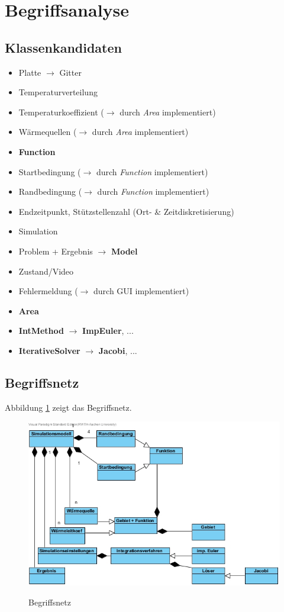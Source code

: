 \section{Begriffsanalyse}

\subsection{Klassenkandidaten}
\begin{itemize}
	\item Platte $\rightarrow$ Gitter
	\item Temperaturverteilung
	\item Temperaturkoeffizient ($\rightarrow$ durch \emph{Area} implementiert)
	\item Wärmequellen ($\rightarrow$ durch \emph{Area} implementiert)
	\item \textbf{Function}
	\item Startbedingung ($\rightarrow$ durch \emph{Function} implementiert)
	\item Randbedingung ($\rightarrow$ durch \emph{Function} implementiert)
	\item Endzeitpunkt, Stützstellenzahl (Ort- \& Zeitdiskretisierung)
	\item Simulation
	\item Problem + Ergebnis $\rightarrow$ \textbf{Model}
	\item Zustand/Video
	\item Fehlermeldung ($\rightarrow$ durch GUI implementiert)
	\item \textbf{Area}
	\item \textbf{IntMethod} $\rightarrow$ \textbf{ImpEuler}, ...
	\item \textbf{IterativeSolver} $\rightarrow$ \textbf{Jacobi}, ...
\end{itemize}

\subsection{Begriffsnetz}
Abbildung \ref{Begriffsnetz} zeigt das Begriffsnetz.
\begin{figure}[H]
	\centering
	\includegraphics[scale=.75]{Bilder/Begriffsnetz.jpg}\\
	\caption{Begriffsnetz}
	\label{Begriffsnetz}
\end{figure}